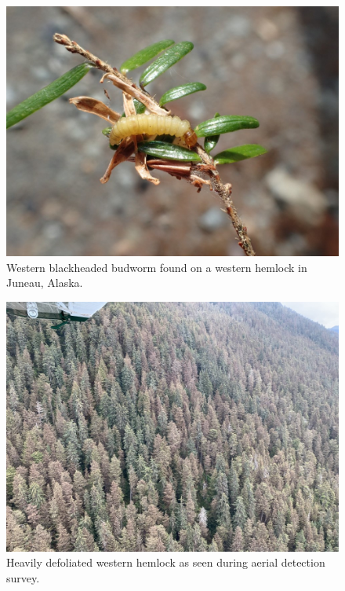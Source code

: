 \begin{multicols}{2}
\begin{figure}[H]
\begin{center}
\vspace{2mm}
\includegraphics[width=\textwidth]{img/western_blackheaded_budworm_larva.jpg}
\caption{Western blackheaded budworm found on a western hemlock in Juneau, Alaska.}
\label{western_blackheaded_budworm_larva}
\end{center}
\end{figure} 

\begin{figure}[H]
\begin{center}
\vspace{2mm}
\includegraphics[width=\textwidth]{img/hemlock_sawfly_defoliation.jpg}
\caption{Heavily defoliated western hemlock as seen during aerial detection survey.}
\label{hemlock_sawfly_defoliation}
\end{center}
\end{figure} 


\end{multicols}
